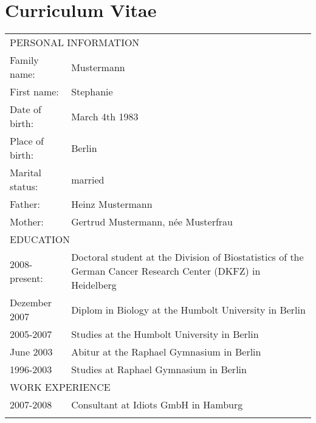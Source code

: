 \chapter*{Curriculum Vitae}
\begin{tabular}{lp{12cm}}
\multicolumn{2}{l}{PERSONAL INFORMATION\vspace{0.5cm}}\\\vspace{2pt}
Family name:&Mustermann\\\vspace{2pt}
First name:&Stephanie\\\vspace{2pt}
Date of birth:&March 4th 1983\\\vspace{2pt}
Place of birth:&Berlin\\\vspace{2pt}
Marital status:&married\\\vspace{2pt}
Father:&Heinz Mustermann\\\vspace{2pt}
Mother:& Gertrud Mustermann, n\'ee Musterfrau\vspace{1cm}\\
\multicolumn{2}{l}{EDUCATION\vspace{0.5cm}}\\\vspace{2pt}
2008-present:&Doctoral student at the Division of Biostatistics of the German Cancer Research Center (DKFZ) in Heidelberg\\
\vspace{2pt}
Dezember 2007&Diplom in Biology at the Humbolt University in Berlin\\
\vspace{2pt}
2005-2007&Studies at the Humbolt University in Berlin\\
\vspace{2pt}
June 2003&Abitur at the Raphael Gymnasium in Berlin\\
\vspace{2pt}
1996-2003&Studies at Raphael Gymnasium in Berlin\vspace{1cm}\\
\multicolumn{2}{l}{WORK EXPERIENCE\vspace{0.5cm}}\\\vspace{2pt}
2007-2008&  Consultant at Idiots GmbH in Hamburg\\\vspace{2pt}
\end{tabular}
